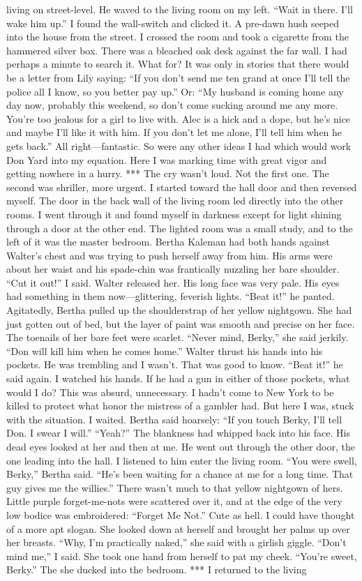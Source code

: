 \documentclass{novel}
\begin{document}
living on street-level. He waved to the living room on my left. “Wait in there. I’ll wake him up.” I found the wall-switch and clicked it. A pre-dawn hush seeped into the house from the street. I crossed the room and took a cigarette from the hammered silver box. There was a bleached oak desk against the far wall. I had perhaps a minute to search it. What for? It was only in stories that there would be a letter from Lily saying: “If you don’t send me ten grand at once I’ll tell the police all I know, so you better pay up.” Or: “My husband is coming home any day now, probably this weekend, so don’t come sucking around me any more. You’re too jealous for a girl to live with. Alec is a hick and a dope, but he’s nice and maybe I’ll like it with him. If you don’t let me alone, I’ll tell him when he gets back.” All right—fantastic. So were any other ideas I had which would work Don Yard into my equation. Here I was marking time with great vigor and getting nowhere in a hurry. *** The cry wasn’t loud. Not the first one. The second was shriller, more urgent. I started toward the hall door and then reversed myself. The door in the back wall of the living room led directly into the other rooms. I went through it and found myself in darkness except for light shining through a door at the other end. The lighted room was a small study, and to the left of it was the master bedroom. Bertha Kaleman had both hands against Walter’s chest and was trying to push herself away from him. His arms were about her waist and his spade-chin was frantically nuzzling her bare shoulder. “Cut it out!” I said. Walter released her. His long face was very pale. His eyes had something in them now—glittering, feverish lights. “Beat it!” he panted. Agitatedly, Bertha pulled up the shoulderstrap of her yellow nightgown. She had just gotten out of bed, but the layer of paint was smooth and precise on her face. The toenails of her bare feet were scarlet. “Never mind, Berky,” she said jerkily. “Don will kill him when he comes home.” Walter thrust his hands into his pockets. He was trembling and I wasn’t. That was good to know. “Beat it!” he said again. I watched his hands. If he had a gun in either of those pockets, what would I do? This was absurd, unnecessary. I hadn’t come to New York to be killed to protect what honor the mistress of a gambler had. But here I was, stuck with the situation. I waited. Bertha said hoarsely: “If you touch Berky, I’ll tell Don. I swear I will.” “Yeah?” The blankness had whipped back into his face. His dead eyes looked at her and then at me. He went out through the other door, the one leading into the hall. I listened to him enter the living room. “You were swell, Berky,” Bertha said. “He’s been waiting for a chance at me for a long time. That guy gives me the willies.” There wasn’t much to that yellow nightgown of hers. Little purple forget-me-nots were scattered over it, and at the edge of the very low bodice was embroidered: “Forget Me Not.” Cute as hell. I could have thought of a more apt slogan. She looked down at herself and brought her palms up over her breasts. “Why, I’m practically naked,” she said with a girlish giggle. “Don’t mind me,” I said. She took one hand from herself to pat my cheek. “You’re sweet, Berky.” The she ducked into the bedroom. *** I returned to the living 
\end{document}
